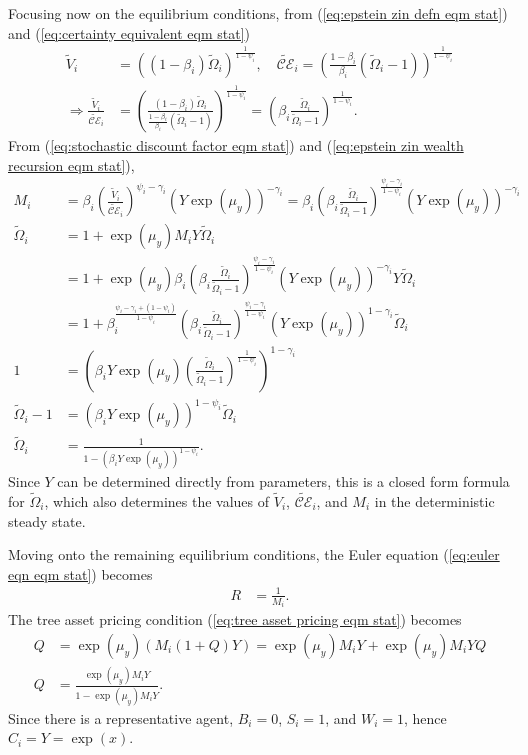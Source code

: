 \documentclass[12 pt, oneside]{article}
\theoremstyle{definition}
\theoremstyle{definition}
\theoremstyle{definition}
\newcommand{\calC}{\mathcal{C}}
\newcommand{\calE}{\mathcal{E}}
\newcommand{\RA}{\Rightarrow}
\begin{document}
Focusing now on the equilibrium conditions, from (\ref{eq:epstein zin defn eqm stat}) and (\ref{eq:certainty equivalent eqm stat})
\begin{align*}
  \tilde{V}_i & = ((1 - \beta_i) \tilde{\Omega}_i)^{\frac{1}{1 - \psi_i}},\quad \tilde{\calC\calE}_i = \left(\frac{1 - \beta_i}{\beta_i} (\tilde{\Omega}_i - 1)\right)^{\frac{1}{1 - \psi_i}}\\
  \RA \frac{\tilde{V}_i}{\tilde{\calC\calE}_i} & = \left(\frac{(1 - \beta_i)\tilde{\Omega}_i}{\frac{1 - \beta_i}{\beta_i} (\tilde{\Omega}_i - 1)}\right)^{\frac{1}{1 - \psi_i}} = \left(\beta_i\frac{\tilde{\Omega}_i}{\tilde{\Omega}_i - 1}\right)^{\frac{1}{1 - \psi_i}}.
\end{align*}
From (\ref{eq:stochastic discount factor eqm stat}) and (\ref{eq:epstein zin wealth recursion eqm stat}),
\begin{align*}
  M_i & = \beta_i\left(\frac{\tilde{V}_i}{\tilde{\calC\calE}_i}\right)^{\psi_i - \gamma_i}(Y\exp(\mu_y))^{ - \gamma_i} = \beta_i\left(\beta_i\frac{\tilde{\Omega}_i}{\tilde{\Omega}_i - 1}\right)^{\frac{\psi_i - \gamma_i}{1 - \psi_i}}(Y\exp(\mu_y))^{ - \gamma_i}\\
  \tilde{\Omega}_i & = 1 + \exp(\mu_y)M_i Y \tilde{\Omega}_i\\
    & = 1 + \exp(\mu_y)\beta_i\left(\beta_i\frac{\tilde{\Omega}_i}{\tilde{\Omega}_i - 1}\right)^{\frac{\psi_i - \gamma_i}{1 - \psi_i}}(Y\exp(\mu_y))^{ - \gamma_i} Y \tilde{\Omega}_i\\
    & = 1 +\beta_i^{\frac{\psi_i - \gamma_i + (1 - \psi_i)}{1 - \psi_i}}\left(\beta_i\frac{\tilde{\Omega}_i}{\tilde{\Omega}_i - 1}\right)^{\frac{\psi_i - \gamma_i}{1 - \psi_i}}(Y\exp(\mu_y))^{1 - \gamma_i} \tilde{\Omega}_i\\
  1 & =  \left(\beta_i Y \exp(\mu_y)\left(\frac{\tilde{\Omega}_i}{\tilde{\Omega}_i - 1}\right)^{\frac{1}{1 - \psi_i}}\right)^{1 - \gamma_i}\\
  \tilde{\Omega}_i - 1 & = (\beta_i Y \exp(\mu_y))^{1 - \psi_i} \tilde{\Omega}_i\\
  \tilde{\Omega}_i & = \frac{1}{1 - (\beta_i Y \exp(\mu_y))^{1 - \psi_i}}.
\end{align*}
Since $Y$ can be determined directly from parameters, this is a closed form formula for $\tilde{\Omega}_i$, which also determines the values of $\tilde{V}_i$, $\tilde{\calC\calE}_i$, and $M_i$ in the deterministic steady state.

Moving onto the remaining equilibrium conditions, the Euler equation (\ref{eq:euler eqn eqm stat}) becomes
\begin{align*}
  R & = \frac{1}{M_i}.
\end{align*}
The tree asset pricing condition (\ref{eq:tree asset pricing eqm stat}) becomes
\begin{align*}
  Q & = \exp(\mu_y) (M_i (1 + Q)Y) = \exp(\mu_y) M_i Y + \exp(\mu_y) M_i Y Q\\
  Q & = \frac{\exp(\mu_y) M_i Y}{1 - \exp(\mu_y) M_i Y}.
\end{align*}
Since there is a representative agent, $B_i = 0$, $S_i = 1$, and $W_i = 1$, hence $C_i = Y = \exp(x)$.
\end{document}

